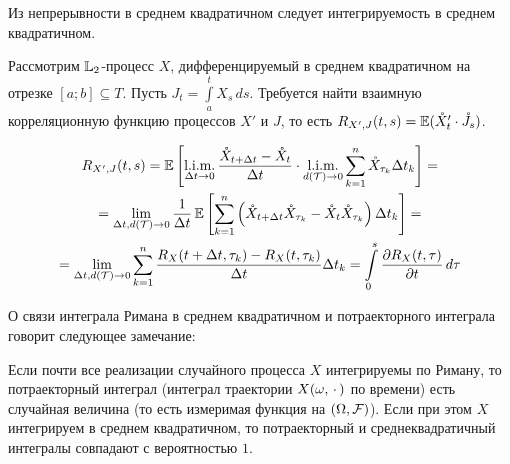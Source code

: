 
\begin{statement}
    \label{statement:calculus:integrability_from_continuity}
    Из непрерывности в среднем квадратичном следует интегрируемость в среднем квадратичном.
\end{statement}


\begin{exercise}
    \label{exercise:calculus:crosscorrelation_derivative_integral}
    Рассмотрим $ \mathbb{L}_2 $-процесс $ X $, дифференцируемый в среднем квадратичном на отрезке $ [a; b] \subseteq T $.
    Пусть $ J_t = \int\limits_a^t X_s \, ds $.
    Требуется найти взаимную корреляционную функцию процессов $ X' $ и $ J $,
    то есть $ R_{X', J}(t, s) = \operatorname{\mathbb{E}} (\mathring{X}_t' \cdot \mathring{J}_s) $.
\end{exercise}

\begin{solution}
    \begin{multline*}
        R_{X', J}(t, s) = \operatorname{\mathbb{E}} \left[ \operatorname*{\textnormal{l.i.m.}}_{\Delta t \to 0} \frac{\mathring{X}_{t + \Delta t} - \mathring{X}_t}{\Delta t} \cdot
        \operatorname*{\textnormal{l.i.m.}}_{d(\mathcal{T}) \to 0} \sum_{k=1}^n \mathring{X}_{\tau_k} \Delta t_k \right] = \\
        = \lim_{\Delta t, d(\mathcal{T}) \to 0} \frac{1}{\Delta t}
        \operatorname{\mathbb{E}} \left[ \sum_{k=1}^n \left( \mathring{X}_{t + \Delta t} \mathring{X}_{\tau_k} - \mathring{X}_t \mathring{X}_{\tau_k} \right) \Delta t_k \right] = \\
        = \lim_{\Delta t, d(\mathcal{T}) \to 0}
        \sum_{k=1}^n \frac{R_X(t + \Delta t, \tau_k) - R_X(t, \tau_k)}{\Delta t} \Delta t_k =
        \int\limits_0^s \frac{\partial R_X(t, \tau)}{\partial t} \, d \tau
    \end{multline*}
\end{solution}


О связи интеграла Римана в среднем квадратичном и потраекторного интеграла говорит следующее замечание:

\begin{remark}
    \label{remark:calculus:trajectories_integrals}
    Если почти все реализации случайного процесса $ X $ интегрируемы по Риману,
    то потраекторный интеграл (интеграл траектории $ X(\omega, \, \cdot \,) $ по времени)
    есть случайная величина (то есть измеримая функция на $ (\Omega, \mathcal{F}) $).
    Если при этом $ X $ интегрируем в среднем квадратичном,
    то потраекторный и среднеквадратичный интегралы совпадают с вероятностью $ 1 $.
\end{remark}
